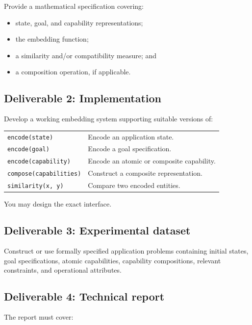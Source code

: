 \documentclass[11pt]{article}
\newcommand{\code}[1]{\texttt{#1}}
\begin{document}
Provide a mathematical specification covering:
\begin{itemize}[itemsep=0.45em]
  \item state, goal, and capability representations;
  \item the embedding function;
  \item a similarity and/or compatibility measure; and
  \item a composition operation, if applicable.
\end{itemize}

\subsection*{Deliverable 2: Implementation}

Develop a working embedding system supporting suitable versions of:

\begin{tabularx}{\textwidth}{@{}L{5.2cm}Y@{}}
\code{encode(state)} & Encode an application state. \\[0.45em]
\code{encode(goal)} & Encode a goal specification. \\[0.45em]
\code{encode(capability)} & Encode an atomic or composite capability. \\[0.45em]
\code{compose(capabilities)} & Construct a composite representation. \\[0.45em]
\code{similarity(x, y)} & Compare two encoded entities.
\end{tabularx}

You may design the exact interface.

\subsection*{Deliverable 3: Experimental dataset}

Construct or use formally specified application problems containing initial states, goal
specifications, atomic capabilities, capability compositions, relevant constraints, and
operational attributes.

\subsection*{Deliverable 4: Technical report}

The report must cover:
\end{document}
